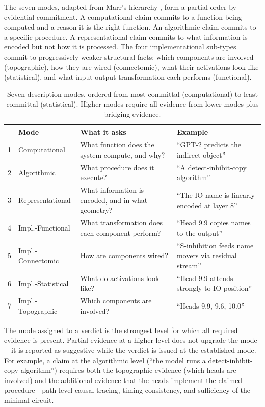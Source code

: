 \documentclass[10pt]{article}
\begin{document}
The seven modes, adapted from Marr's hierarchy \citep{marr1982vision}, form a partial order by evidential commitment. A computational claim commits to a function being computed and a reason it is the right function. An algorithmic claim commits to a specific procedure. A representational claim commits to what information is encoded but not how it is processed. The four implementational sub-types commit to progressively weaker structural facts: which components are involved (topographic), how they are wired (connectomic), what their activations look like (statistical), and what input-output transformation each performs (functional).

\begin{table}[H]
\centering
\small
\caption{Seven description modes, ordered from most committal (computational) to least committal (statistical). Higher modes require all evidence from lower modes plus bridging evidence.}
\label{tab:modes}
\renewcommand{\arraystretch}{1.2}
\begin{tabular}{@{}rl>{\raggedright\arraybackslash}p{4.8cm}>{\raggedright\arraybackslash}p{5.2cm}@{}}
\toprule
& \textbf{Mode} & \textbf{What it asks} & \textbf{Example} \\
\midrule
1 & Computational & What function does the system compute, and why? & ``GPT-2 predicts the indirect object'' \\
\midrule
2 & Algorithmic & What procedure does it execute? & ``A detect-inhibit-copy algorithm'' \\
\midrule
3 & Representational & What information is encoded, and in what geometry? & ``The IO name is linearly encoded at layer 8'' \\
\midrule
4 & Impl.-Functional & What transformation does each component perform? & ``Head 9.9 copies names to the output'' \\
\midrule
5 & Impl.-Connectomic & How are components wired? & ``S-inhibition feeds name movers via residual stream'' \\
\midrule
6 & Impl.-Statistical & What do activations look like? & ``Head 9.9 attends strongly to IO position'' \\
\midrule
7 & Impl.-Topographic & Which components are involved? & ``Heads 9.9, 9.6, 10.0'' \\
\bottomrule
\end{tabular}
\end{table}

The mode assigned to a verdict is the strongest level for which all required evidence is present. Partial evidence at a higher level does not upgrade the mode---it is reported as suggestive while the verdict is issued at the established mode. For example, a claim at the algorithmic level (``the model runs a detect-inhibit-copy algorithm'') requires both the topographic evidence (which heads are involved) and the additional evidence that the heads implement the claimed procedure---path-level causal tracing, timing consistency, and sufficiency of the minimal circuit.
\end{document}
